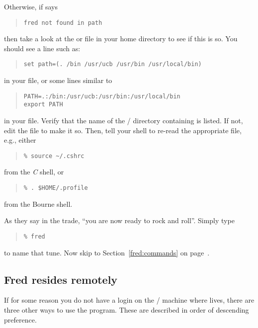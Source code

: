 Otherwise,
if  says
\begin{quote}\small\begin{verbatim}
fred not found in path
\end{verbatim}\end{quote}
then take a look at the  or  file in your home
directory to see if this is so.
You should see a line such as:
\begin{quote}\small\begin{verbatim}
set path=(. /bin /usr/ucb /usr/bin /usr/local/bin)
\end{verbatim}\end{quote}
in your  file,
or some lines similar to
\begin{quote}\small\begin{verbatim}
PATH=.:/bin:/usr/ucb:/usr/bin:/usr/local/bin
export PATH
\end{verbatim}\end{quote}
in your  file.
Verify that the name of the \unix/ directory containing  is listed.
If not,
edit the file to make it so.
Then,
tell your shell to re-read the appropriate file,
e.g.,
either
\begin{quote}\small\begin{verbatim}
% source ~/.cshrc
\end{verbatim}\end{quote}
from the {\em C\/} shell,
or
\begin{quote}\small\begin{verbatim}
% . $HOME/.profile
\end{verbatim}\end{quote}
from the Bourne shell.

As they say in the trade,
``you are now ready to rock and roll''.
Simply type
\begin{quote}\small\begin{verbatim}
% fred
\end{verbatim}\end{quote}
to name that tune.
Now skip to Section~\ref{fred:commands} on page~\pageref{fred:commands}.

\subsection	{Fred resides remotely}
If for some reason you do not have a login on the \unix/ machine where
 lives,
there are three other ways to use the  program.
These are described in order of descending preference.


